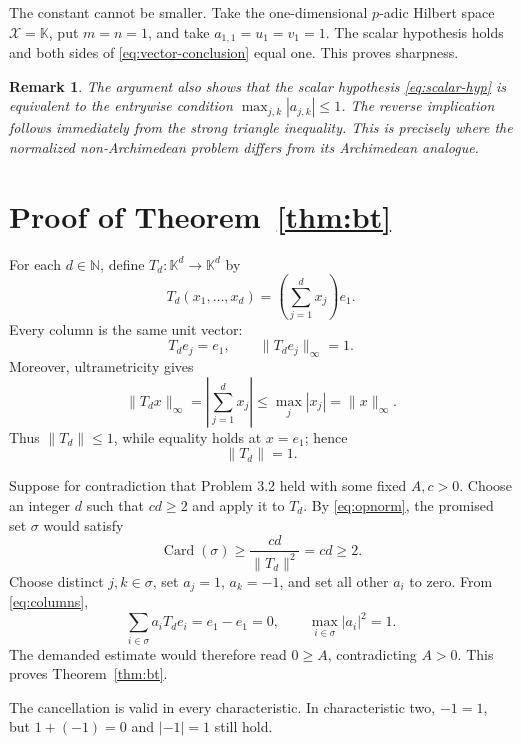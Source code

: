 \documentclass[11pt]{article}
\newtheorem{remark}[theorem]{Remark}
\newcommand{\K}{\mathbb K}
\newcommand{\N}{\mathbb N}
\newcommand{\card}{\operatorname{Card}}
\begin{document}
The constant cannot be smaller.  Take the one-dimensional $p$-adic Hilbert
space $\mathcal X=\K$, put $m=n=1$, and take
$a_{1,1}=u_1=v_1=1$.  The scalar hypothesis holds and both sides of
\eqref{eq:vector-conclusion} equal one.  This proves sharpness.

\begin{remark}\label{rem:equiv}
The argument also shows that the scalar hypothesis \eqref{eq:scalar-hyp} is
equivalent to the entrywise condition $\max_{j,k}|a_{j,k}|\le1$.  The reverse
implication follows immediately from the strong triangle inequality.  This
is precisely where the normalized non-Archimedean problem differs from its
Archimedean analogue.
\end{remark}

\section{Proof of Theorem~\ref{thm:bt}}

For each $d\in\N$, define $T_d:\K^d\to\K^d$ by
\begin{equation}\label{eq:T}
 T_d(x_1,\ldots,x_d)=\left(\sum_{j=1}^d x_j\right)e_1.
\end{equation}
Every column is the same unit vector:
\begin{equation}\label{eq:columns}
                    T_de_j=e_1,\qquad \lVert T_de_j\rVert_\infty=1.
\end{equation}
Moreover, ultrametricity gives
\[
 \lVert T_dx\rVert_\infty
 =\left|\sum_{j=1}^d x_j\right|
 \le\max_j|x_j|=\lVert x\rVert_\infty.
\]
Thus $\lVert T_d\rVert\le1$, while equality holds at $x=e_1$; hence
\begin{equation}\label{eq:opnorm}
                         \lVert T_d\rVert=1.
\end{equation}

Suppose for contradiction that Problem 3.2 held with some fixed $A,c>0$.
Choose an integer $d$ such that $cd\ge2$ and apply it to $T_d$.  By
\eqref{eq:opnorm}, the promised set $\sigma$ would satisfy
\[
             \card(\sigma)\ge \frac{cd}{\lVert T_d\rVert^2}=cd\ge2.
\]
Choose distinct $j,k\in\sigma$, set $a_j=1$, $a_k=-1$, and set all other
$a_i$ to zero.  From \eqref{eq:columns},
\[
       \sum_{i\in\sigma}a_iT_de_i=e_1-e_1=0,
       \qquad \max_{i\in\sigma}|a_i|^2=1.
\]
The demanded estimate would therefore read $0\ge A$, contradicting $A>0$.
This proves Theorem~\ref{thm:bt}.

The cancellation is valid in every characteristic.  In characteristic two,
$-1=1$, but $1+(-1)=0$ and $|-1|=1$ still hold.
\end{document}
